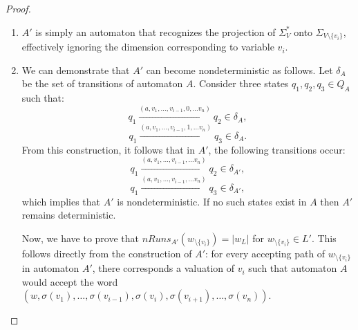 \documentclass[12pt]{article}
\theoremstyle{definition}
\begin{document}
\begin{proof} \

    \begin{enumerate}
        \item $A'$ is simply an automaton that recognizes the projection of $\Sigma_V^*$ onto $\Sigma_{V \setminus \{v_i\}}$, effectively ignoring the dimension corresponding to variable $v_i$.
        \item We can demonstrate that $A'$ can become nondeterministic as follows. Let $\delta_A$ be the set of transitions of automaton $A$. Consider three states $q_1, q_2, q_3 \in Q_A$ such that:
        $$q_1 \xrightarrow{(a, v_1, \ldots, v_{i-1}, 0, \ldots v_n)} q_2 \in \delta_A,$$ 
        $$q_1 \xrightarrow{(a, v_1, \ldots, v_{i-1}, 1, \ldots v_n)} q_3 \in \delta_A.$$
        From this construction, it follows that in $A'$, the following transitions occur:
        $$q_1 \xrightarrow{(a, v_1, \ldots, v_{i-1}, \ldots v_n)} q_2 \in \delta_{A'},$$ 
        $$q_1 \xrightarrow{(a, v_1, \ldots, v_{i-1}, \ldots v_n)} q_3 \in \delta_{A'},$$
        which implies that $A'$ is nondeterministic. If no such states exist in $A$ then $A'$ remains deterministic. 
        
        Now, we have to prove that $nRuns_{A'}(w_{\setminus\{v_i\}}) = |w_L|$ for $w_{\setminus\{v_i\}} \in L'$. This follows directly from the construction of $A'$: for every accepting path of $w_{\setminus\{v_i\}}$ in automaton $A'$, there corresponds a valuation of $v_i$ such that automaton $A$ would accept the word $(w, \sigma(v_1), \ldots, \sigma(v_{i-1}), \sigma(v_i), \sigma(v_{i+1}), \ldots, \sigma(v_n))$.
    \end{enumerate}
\end{proof}
\end{document}
